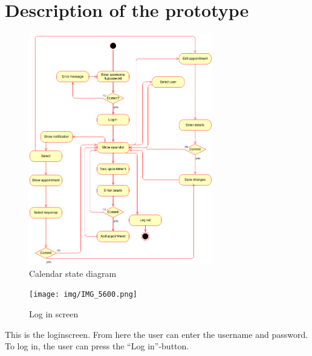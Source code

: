 \documentclass{article}
\begin{document}




\section{Description of the prototype}
\begin{figure}[h!] 
    \begin{center} 
        \includegraphics[width=8cm]{img/calendarStateDiagram.png}
        \caption{Calendar state diagram}
    \label{calendarstatediagram}
    \end{center}
\end{figure}

\newpage

\begin{figure}[h!] 
    \begin{center} 
        \texttt{[image: img/IMG\_5600.png]}
        \caption{Log in screen}
    \label{login}
    \end{center}
\end{figure}
This is the loginscreen. From here the user can enter the username and password. To log in, the user can press the ``Log in''-button.
\end{document}
